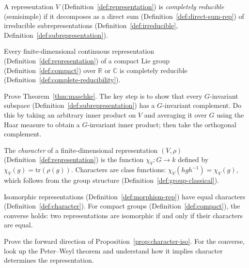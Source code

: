 \begin{definition}
\label{def:complete-reducibility}
A representation $V$ (Definition~\ref{def:representation}) is \emph{completely reducible} (semisimple) if it decomposes as a direct sum (Definition~\ref{def:direct-sum-rep}) of irreducible subrepresentations (Definition~\ref{def:irreducible}, Definition~\ref{def:subrepresentation}).
\end{definition}

\begin{theorem}
\label{thm:maschke}
Every finite-dimensional continuous representation (Definition~\ref{def:representation}) of a compact Lie group (Definition~\ref{def:compact}) over $\mathbb{R}$ or $\mathbb{C}$ is completely reducible (Definition~\ref{def:complete-reducibility}).
\end{theorem}

\begin{exercise}
Prove Theorem~\ref{thm:maschke}. The key step is to show that every $G$-invariant subspace (Definition~\ref{def:subrepresentation}) has a $G$-invariant complement. Do this by taking an arbitrary inner product on $V$ and averaging it over $G$ using the Haar measure to obtain a $G$-invariant inner product; then take the orthogonal complement.
\end{exercise}

\begin{definition}[Character]
\label{def:character}
The \emph{character} of a finite-dimensional representation $(V, \rho)$ (Definition~\ref{def:representation}) is the function $\chi_V : G \to k$ defined by $\chi_V(g) = \mathrm{tr}(\rho(g))$.
Characters are class functions: $\chi_V(hgh^{-1}) = \chi_V(g)$, which follows from the group structure (Definition~\ref{def:group-classical}).
\end{definition}

\begin{proposition}
\label{prop:character-iso}
Isomorphic representations (Definition~\ref{def:morphism-rep}) have equal characters (Definition~\ref{def:character}).
For compact groups (Definition~\ref{def:compact}), the converse holds: two representations are isomorphic if and only if their characters are equal.
\end{proposition}

\begin{exercise}
Prove the forward direction of Proposition~\ref{prop:character-iso}. For the converse, look up the Peter--Weyl theorem and understand how it implies character determines the representation.
\end{exercise}

